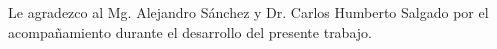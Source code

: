 \begin{thanks}
Le agradezco al Mg. Alejandro Sánchez y Dr. Carlos Humberto Salgado por el acompañamiento durante el desarrollo del presente trabajo.
\end{thanks}

